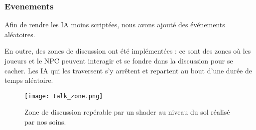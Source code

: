    
    \subsubsection{Evenements}

    Afin de rendre les IA moins scriptées, nous avons ajouté des événements aléatoires.
    
    En outre, des zones de discussion ont été implémentées : ce sont des zones où les joueurs et le NPC peuvent interagir 
    et se fondre dans la discussion pour se cacher. Les IA qui les traversent s'y arrêtent et repartent au bout d'une durée 
    de temps aléatoire.

    \begin{figure}[hbt!]
        \centering
        \texttt{[image: talk\_zone.png]}
        \caption{Zone de discussion repérable par un shader au niveau du sol réalisé par nos soins.}
    \end{figure}